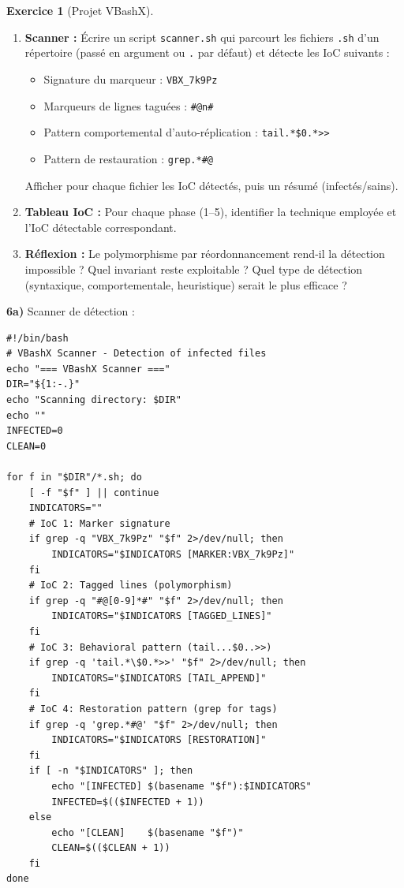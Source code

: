 \documentclass[a4paper,11pt]{article}
\theoremstyle{plain}
\theoremstyle{definition}
\newtheorem{exercice}{Exercice}
\begin{document}
\begin{exercice}[Projet VBashX]
\begin{enumerate}
\item[\textbf{6a)}] \textbf{Scanner :} Écrire un script \texttt{scanner.sh} qui parcourt les fichiers \texttt{.sh} d'un répertoire (passé en argument ou \texttt{.} par défaut) et détecte les IoC suivants :
\begin{itemize}
    \item Signature du marqueur : \texttt{VBX\_7k9Pz}
    \item Marqueurs de lignes taguées : \texttt{\#@n\#}
    \item Pattern comportemental d'auto-réplication : \texttt{tail.*\$0.*>>}
    \item Pattern de restauration : \texttt{grep.*\#@}
\end{itemize}
Afficher pour chaque fichier les IoC détectés, puis un résumé (infectés/sains).

\item[\textbf{6b)}] \textbf{Tableau IoC :} Pour chaque phase (1--5), identifier la technique employée et l'IoC détectable correspondant.

\item[\textbf{6c)}] \textbf{Réflexion :} Le polymorphisme par réordonnancement rend-il la détection impossible ? Quel invariant reste exploitable ? Quel type de détection (syntaxique, comportementale, heuristique) serait le plus efficace ?
\end{enumerate}

\begin{correction}

\textbf{6a)} Scanner de détection :
\begin{lstlisting}[title=scanner.sh]
#!/bin/bash
# VBashX Scanner - Detection of infected files
echo "=== VBashX Scanner ==="
DIR="${1:-.}"
echo "Scanning directory: $DIR"
echo ""
INFECTED=0
CLEAN=0

for f in "$DIR"/*.sh; do
    [ -f "$f" ] || continue
    INDICATORS=""
    # IoC 1: Marker signature
    if grep -q "VBX_7k9Pz" "$f" 2>/dev/null; then
        INDICATORS="$INDICATORS [MARKER:VBX_7k9Pz]"
    fi
    # IoC 2: Tagged lines (polymorphism)
    if grep -q "#@[0-9]*#" "$f" 2>/dev/null; then
        INDICATORS="$INDICATORS [TAGGED_LINES]"
    fi
    # IoC 3: Behavioral pattern (tail...$0..>>)
    if grep -q 'tail.*\$0.*>>' "$f" 2>/dev/null; then
        INDICATORS="$INDICATORS [TAIL_APPEND]"
    fi
    # IoC 4: Restoration pattern (grep for tags)
    if grep -q 'grep.*#@' "$f" 2>/dev/null; then
        INDICATORS="$INDICATORS [RESTORATION]"
    fi
    if [ -n "$INDICATORS" ]; then
        echo "[INFECTED] $(basename "$f"):$INDICATORS"
        INFECTED=$(($INFECTED + 1))
    else
        echo "[CLEAN]    $(basename "$f")"
        CLEAN=$(($CLEAN + 1))
    fi
done


\end{lstlisting}
\end{correction}
\end{exercice}
\end{document}
